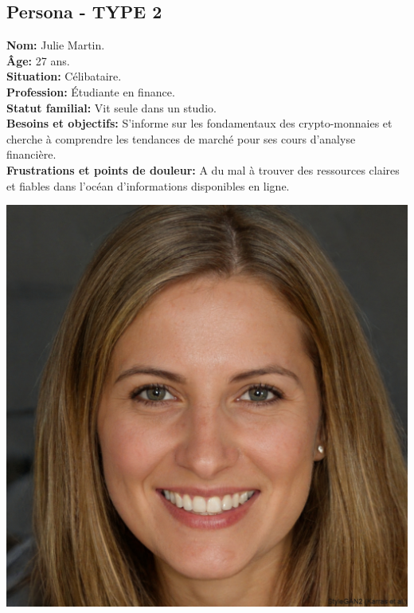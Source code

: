 \documentclass[a4paper,11pt]{article}
\begin{document}
\subsection{Persona - TYPE 2}
\begin{minipage}{0.6\textwidth} %
    \textbf{Nom:} Julie Martin.\\
    \textbf{Âge:} 27 ans.\\
    \textbf{Situation:} Célibataire.\\
    \textbf{Profession:} Étudiante en finance.\\
    \textbf{Statut familial:} Vit seule dans un studio.\\
    \textbf{Besoins et objectifs:} S’informe sur les fondamentaux des crypto-monnaies et cherche à comprendre les tendances de marché pour ses cours d’analyse financière.\\
    \textbf{Frustrations et points de douleur:} A du mal à trouver des ressources claires et fiables dans l’océan d’informations disponibles en ligne.\\
\end{minipage}%
\hspace{1cm}
\begin{minipage}{0.3\textwidth} %
    \begin{center}
        \includegraphics[width=\textwidth]{images/camelott.jpeg} %
    \end{center}
\end{minipage}
\end{document}
